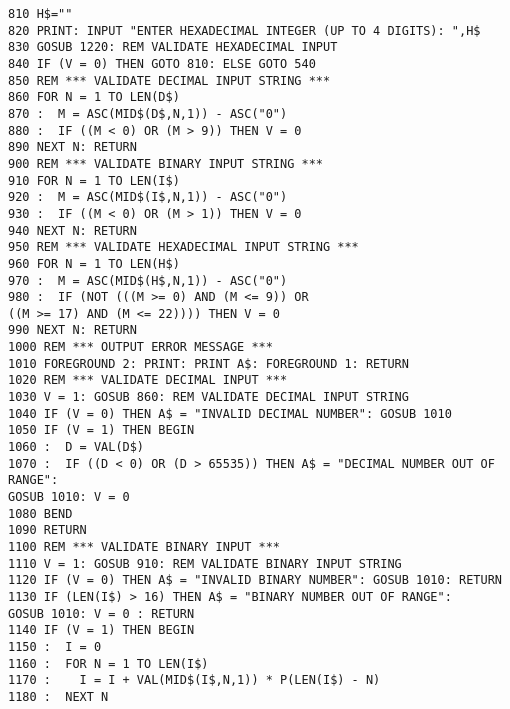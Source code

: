 \begin{tcolorbox}[colback=black,coltext=white]
\verbatimfont{\codefont}
\begin{verbatim}
810 H$=""
820 PRINT: INPUT "ENTER HEXADECIMAL INTEGER (UP TO 4 DIGITS): ",H$
830 GOSUB 1220: REM VALIDATE HEXADECIMAL INPUT
840 IF (V = 0) THEN GOTO 810: ELSE GOTO 540
850 REM *** VALIDATE DECIMAL INPUT STRING ***
860 FOR N = 1 TO LEN(D$)
870 :  M = ASC(MID$(D$,N,1)) - ASC("0")
880 :  IF ((M < 0) OR (M > 9)) THEN V = 0
890 NEXT N: RETURN
900 REM *** VALIDATE BINARY INPUT STRING ***
910 FOR N = 1 TO LEN(I$)
920 :  M = ASC(MID$(I$,N,1)) - ASC("0")
930 :  IF ((M < 0) OR (M > 1)) THEN V = 0
940 NEXT N: RETURN
950 REM *** VALIDATE HEXADECIMAL INPUT STRING ***
960 FOR N = 1 TO LEN(H$)
970 :  M = ASC(MID$(H$,N,1)) - ASC("0")
980 :  IF (NOT (((M >= 0) AND (M <= 9)) OR
((M >= 17) AND (M <= 22)))) THEN V = 0
990 NEXT N: RETURN
1000 REM *** OUTPUT ERROR MESSAGE ***
1010 FOREGROUND 2: PRINT: PRINT A$: FOREGROUND 1: RETURN
1020 REM *** VALIDATE DECIMAL INPUT ***
1030 V = 1: GOSUB 860: REM VALIDATE DECIMAL INPUT STRING
1040 IF (V = 0) THEN A$ = "INVALID DECIMAL NUMBER": GOSUB 1010
1050 IF (V = 1) THEN BEGIN
1060 :  D = VAL(D$)
1070 :  IF ((D < 0) OR (D > 65535)) THEN A$ = "DECIMAL NUMBER OUT OF RANGE":
GOSUB 1010: V = 0
1080 BEND
1090 RETURN
1100 REM *** VALIDATE BINARY INPUT ***
1110 V = 1: GOSUB 910: REM VALIDATE BINARY INPUT STRING
1120 IF (V = 0) THEN A$ = "INVALID BINARY NUMBER": GOSUB 1010: RETURN
1130 IF (LEN(I$) > 16) THEN A$ = "BINARY NUMBER OUT OF RANGE":
GOSUB 1010: V = 0 : RETURN
1140 IF (V = 1) THEN BEGIN
1150 :  I = 0
1160 :  FOR N = 1 TO LEN(I$)
1170 :    I = I + VAL(MID$(I$,N,1)) * P(LEN(I$) - N)
1180 :  NEXT N
\end{verbatim}
\end{tcolorbox}
